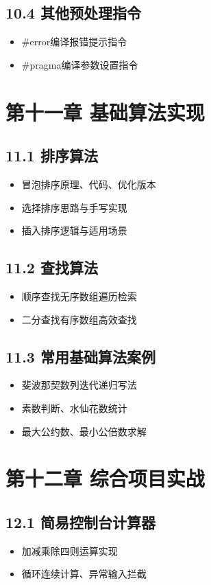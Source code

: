 \subsection{10.4 其他预处理指令}
\begin{itemize}
\item \#error编译报错提示指令
\item \#pragma编译参数设置指令
\end{itemize}

\section{第十一章 基础算法实现}
\subsection{11.1 排序算法}
\begin{itemize}
\item 冒泡排序原理、代码、优化版本
\item 选择排序思路与手写实现
\item 插入排序逻辑与适用场景
\end{itemize}

\subsection{11.2 查找算法}
\begin{itemize}
\item 顺序查找无序数组遍历检索
\item 二分查找有序数组高效查找
\end{itemize}

\subsection{11.3 常用基础算法案例}
\begin{itemize}
\item 斐波那契数列迭代递归写法
\item 素数判断、水仙花数统计
\item 最大公约数、最小公倍数求解
\end{itemize}

\section{第十二章 综合项目实战}
\subsection{12.1 简易控制台计算器}
\begin{itemize}
\item 加减乘除四则运算实现
\item 循环连续计算、异常输入拦截
\end{itemize}

